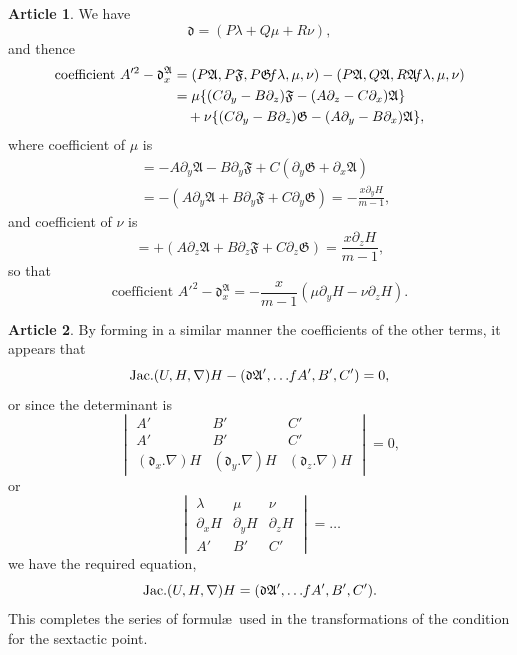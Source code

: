 \documentclass[12pt,a4paper]{article}
\theoremstyle{definition}
\newtheorem{art}{Article}[section]
\DeclareMathOperator{\Jac}{Jac.}
\begin{document}
\begin{art}
We have
\[
\mathfrak{d} = (P\lambda + Q\mu + R\nu),
\]
and thence
\begin{align*}
\text{coefficient } A'^2 - \mathfrak{d}_x^\mathfrak{A} &= (P\mathfrak{A}, P\mathfrak{F}, P\mathfrak{G} \hspace{-2pt} f\lambda, \mu, \nu) - (P\mathfrak{A}, Q\mathfrak{A}, R\mathfrak{A} \hspace{-2pt} f\lambda, \mu, \nu) \\
&= \mu\{(C\partial_y - B\partial_z)\mathfrak{F} - (A\partial_z - C\partial_x)\mathfrak{A}\} \\
&\quad + \nu\{(C\partial_y - B\partial_z)\mathfrak{G} - (A\partial_y - B\partial_x)\mathfrak{A}\},
\end{align*}
where coefficient of $\mu$ is
\begin{align*}
&= -A\partial_y\mathfrak{A} - B\partial_y\mathfrak{F} + C(\partial_y\mathfrak{G} + \partial_x\mathfrak{A}) \\
&= -(A\partial_y\mathfrak{A} + B\partial_y\mathfrak{F} + C\partial_y\mathfrak{G}) = -\frac{x\partial_y H}{m - 1},
\end{align*}
and coefficient of $\nu$ is
\[
= +(A\partial_z\mathfrak{A} + B\partial_z\mathfrak{F} + C\partial_z\mathfrak{G}) = \frac{x\partial_z H}{m - 1},
\]
so that
\[
\text{coefficient } A'^2 - \mathfrak{d}_x^\mathfrak{A} = -\frac{x}{m - 1}(\mu\partial_y H - \nu\partial_z H).
\]
\end{art}

\begin{art}
By forming in a similar manner the coefficients of the other terms, it appears that
\[
\Jac(U, H, \nabla)H - (\mathfrak{d}\mathfrak{A}', \ldots \hspace{-2pt} fA', B', C') = 0,
\]
or since the determinant is
\[
\begin{vmatrix} A' & B' & C' \\ A' & B' & C' \\ (\mathfrak{d}_x.\nabla)H & (\mathfrak{d}_y.\nabla)H & (\mathfrak{d}_z.\nabla)H \end{vmatrix} = 0,
\]
or
\[
\begin{vmatrix} \lambda & \mu & \nu \\ \partial_x H & \partial_y H & \partial_z H \\ A' & B' & C' \end{vmatrix} = \ldots
\]
we have the required equation,
\[
\Jac(U, H, \nabla)H = (\mathfrak{d}\mathfrak{A}', \ldots \hspace{-2pt} fA', B', C').
\]
This completes the series of formul\ae\ used in the transformations of the condition for the sextactic point.
\end{art}
\end{document}
